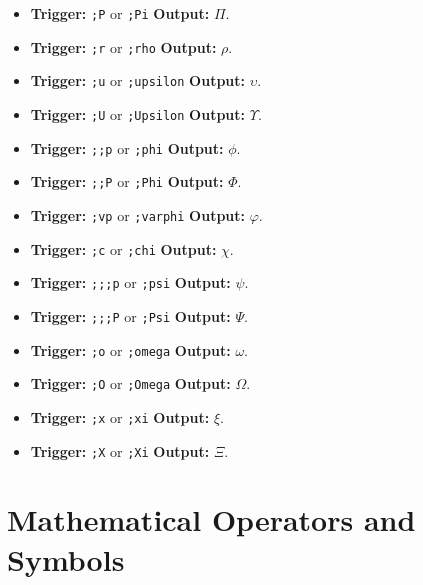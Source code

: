 \documentclass{article}
\begin{document}
\begin{itemize}[leftmargin=*, label={}]
\item \textbf{Trigger:} \texttt{;P} or \texttt{;Pi} \quad\textbf{Output:} $\Pi$.
\item \textbf{Trigger:} \texttt{;r} or \texttt{;rho} \quad\textbf{Output:} $\rho$.
\item \textbf{Trigger:} \texttt{;u} or \texttt{;upsilon} \quad\textbf{Output:} $\upsilon$.
\item \textbf{Trigger:} \texttt{;U} or \texttt{;Upsilon} \quad\textbf{Output:} $\Upsilon$.
\item \textbf{Trigger:} \texttt{;;p} or \texttt{;phi} \quad\textbf{Output:} $\phi$.
\item \textbf{Trigger:} \texttt{;;P} or \texttt{;Phi} \quad\textbf{Output:} $\Phi$.
\item \textbf{Trigger:} \texttt{;vp} or \texttt{;varphi} \quad\textbf{Output:} $\varphi$.
\item \textbf{Trigger:} \texttt{;c} or \texttt{;chi} \quad\textbf{Output:} $\chi$.
\item \textbf{Trigger:} \texttt{;;;p} or \texttt{;psi} \quad\textbf{Output:} $\psi$.
\item \textbf{Trigger:} \texttt{;;;P} or \texttt{;Psi} \quad\textbf{Output:} $\Psi$.
\item \textbf{Trigger:} \texttt{;o} or \texttt{;omega} \quad\textbf{Output:} $\omega$.
\item \textbf{Trigger:} \texttt{;O} or \texttt{;Omega} \quad\textbf{Output:} $\Omega$.
\item \textbf{Trigger:} \texttt{;x} or \texttt{;xi} \quad\textbf{Output:} $\xi$.
\item \textbf{Trigger:} \texttt{;X} or \texttt{;Xi} \quad\textbf{Output:} $\Xi$.
\end{itemize}

\section{Mathematical Operators and Symbols}
\end{document}
